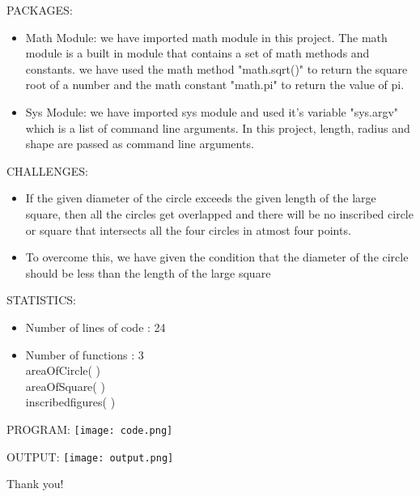 \documentclass[10pt]{beamer}
\begin{document}
\begin{frame}{PACKAGES:}
\begin{itemize}
\item Math Module: we have imported math module in this project. The math module is a
built in module that contains a set of math methods and constants. we have used the math
method "math.sqrt()" to return the square root of a number and the math constant "math.pi" to
return the value of pi.
\end{itemize}
\begin{itemize}
\item Sys Module: we have imported sys module and used it's variable "sys.argv" which is
a list of command line arguments. In this project, length, radius and shape are passed as
command line arguments.
\end{itemize}
\end{frame}
\begin{frame}{CHALLENGES:}
\begin{itemize}
\item If the given diameter of the circle exceeds the
given length of the large square, then all the circles get overlapped and there will be no
inscribed circle or square that intersects all the four circles in atmost four points.
\end{itemize}
\begin{itemize}
\item To overcome this, we have given the condition that the diameter of the circle should
be less than the length of the large square
\end{itemize}
\end{frame}
\begin{frame}{STATISTICS: }
\begin{itemize}
\item Number of lines of code : 24
\end{itemize}
\begin{itemize}
\item Number of functions : 3 \\ \vspace{3}
\hspace{5} areaOfCircle( ) \\ \vspace{1} \hspace{5} areaOfSquare( ) \\ \vspace{1} \hspace{5}
inscribedfigures( )
\end{itemize}
\end{frame}
\begin{frame}{PROGRAM:}
\texttt{[image: code.png]}
\end{frame}
\begin{frame}{OUTPUT:}
\texttt{[image: output.png]}
\end{frame}
\begin{frame}
\textcolor{myNewColorA}{\Huge{\centerline{Thank you!}}}
\end{frame}
\end{document}
